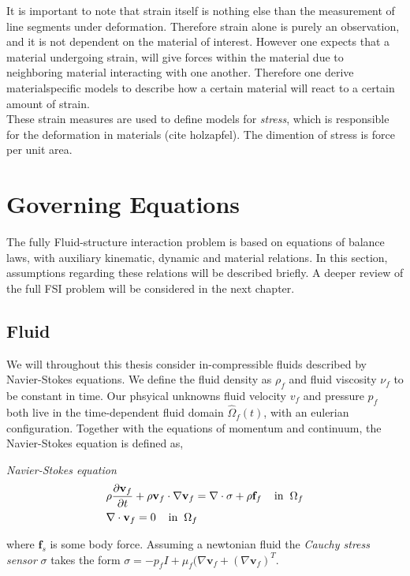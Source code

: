 It is important to note that strain itself is nothing else than the measurement of line segments under deformation. Therefore strain alone is purely an observation, and it is not dependent on the material of interest. However one expects that a material undergoing strain, will give  forces within the material due to neighboring material interacting with one another. Therefore one derive materialspecific models to describe how a certain material will react to a certain amount of strain.\\
These strain measures are used to define models for \textit{stress}, which is responsible for the deformation in materials (cite holzapfel). The dimention of stress is force per unit area.

\section{Governing Equations}
The fully Fluid-structure interaction problem is based on equations of balance laws, with auxiliary kinematic, dynamic and material relations. In this section, assumptions regarding these relations will be described briefly. A deeper review of the full FSI problem will be considered in the next chapter. 

\subsection{Fluid}
We will throughout this thesis consider in-compressible fluids described by Navier-Stokes equations. We define the fluid density as $\rho_f$ and fluid viscosity $\nu_f$ to be constant in time. Our phsyical unknowns
fluid velocity $v_f$ and pressure $p_f$ both live in the time-dependent fluid domain  $\hat{\Omega}_f(t)$, with an eulerian configuration. Together with the equations of momentum and continuum, the Navier-Stokes equation is defined as,

\begin{equat}
\textit{Navier-Stokes equation}
\begin{align}
&\rho \frac{\partial \mathbf{v}_f}{\partial t} + \rho \mathbf{v}_f \cdot \nabla \mathbf{v}_f =
\nabla \cdot \sigma + \rho \mathbf{f}_f \hspace{4mm} \text{in} \hspace{2mm} \Omega_f \\
&\nabla \cdot \mathbf{v}_f = 0 \hspace{4mm} \text{in} \hspace{2mm} \Omega_f 
\end{align} 
\end{equat}
where $\mathbf{f}_s$ is some body force. 
Assuming a newtonian fluid the \textit{Cauchy stress sensor} $\sigma$ takes the form \newline $\sigma = -p_f I + \mu_f (\nabla \mathbf{v}_f + (\nabla \mathbf{v}_f)^T$.

